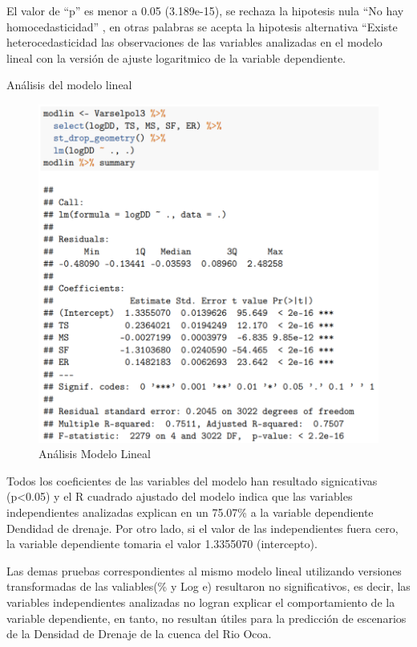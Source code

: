 \documentclass[11pt,]{article}
\begin{document}
El valor de ``p'' es menor a 0.05 (3.189e-15), se rechaza la hipotesis
nula ``No hay homocedasticidad'' , en otras palabras se acepta la
hipotesis alternativa ``Existe heterocedasticidad las observaciones de
las variables analizadas en el modelo lineal con la versión de ajuste
logaritmico de la variable dependiente.

Análisis del modelo lineal

\begin{figure}
\centering
\includegraphics{Imagenes/modelolineal.png}
\caption{Análisis Modelo Lineal}
\end{figure}

Todos los coeficientes de las variables del modelo han resultado
signicativas (p\textless{}0.05) y el R cuadrado ajustado del modelo
indica que las variables independientes analizadas explican en un
75.07\% a la variable dependiente Dendidad de drenaje. Por otro lado, si
el valor de las independientes fuera cero, la variable dependiente
tomaria el valor 1.3355070 (intercepto).

Las demas pruebas correspondientes al mismo modelo lineal utilizando
versiones transformadas de las valiables(\% y Log e) resultaron no
significativos, es decir, las variables independientes analizadas no
logran explicar el comportamiento de la variable dependiente, en tanto,
no resultan útiles para la predicción de escenarios de la Densidad de
Drenaje de la cuenca del Rio Ocoa.
\end{document}

